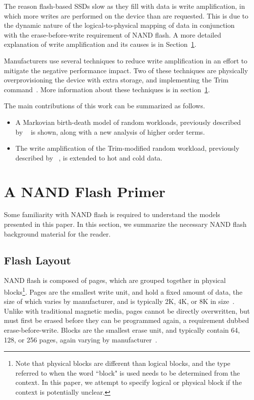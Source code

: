 \documentclass[prodmode,acmtos]{acmsmall}
\begin{document}
The reason flash-based SSDs slow as they fill with data is write amplification, in which more writes are performed on the device than are requested.  This is due to the dynamic nature of the logical-to-physical mapping of data in conjunction with the erase-before-write requirement of NAND flash.  A more detailed explanation of write amplification and its causes is in Section~\ref{sec:NAND_primer}.

Manufacturers use several techniques to reduce write amplification in an effort to mitigate the negative performance impact.  Two of these techniques are physically overprovisioning the device with extra storage, and implementing the Trim command~\cite{TrimSpec}.  More information about these techniques is in section~\ref{sec:NAND_primer}.

The main contributions of this work can be summarized as follows.
\begin{itemize}
\item A Markovian birth-death model of random workloads, previously described by ~ is shown, along with a new analysis of higher order terms.
\item The write amplification of the Trim-modified random workload, previously described by ~, is extended to hot and cold data.
\end{itemize}


\section{A NAND Flash Primer}\label{sec:NAND_primer}
Some familiarity with NAND flash is required to understand the models presented in this paper.  In this section, we summarize the necessary NAND flash background material for the reader.

\subsection{Flash Layout}
NAND flash is composed of pages, which are grouped together in physical blocks\footnote{Note that physical blocks are different than logical blocks, and the type referred to when the word ``block" is used needs to be determined from the context.  In this paper, we attempt to specify logical or physical block if the context is potentially unclear.}.  Pages are the smallest write unit, and hold a fixed amount of data, the size of which varies by manufacturer, and is typically 2K, 4K, or 8K in size~\cite{grupp2009characterizing,roberts2009integrating}.  Unlike with traditional magnetic media, pages cannot be directly overwritten, but must first be erased before they can be programmed again, a requirement dubbed erase-before-write.  Blocks are the smallest erase unit, and typically contain 64, 128, or 256 pages, again varying by manufacturer~\cite{grupp2009characterizing}.
\end{document}
